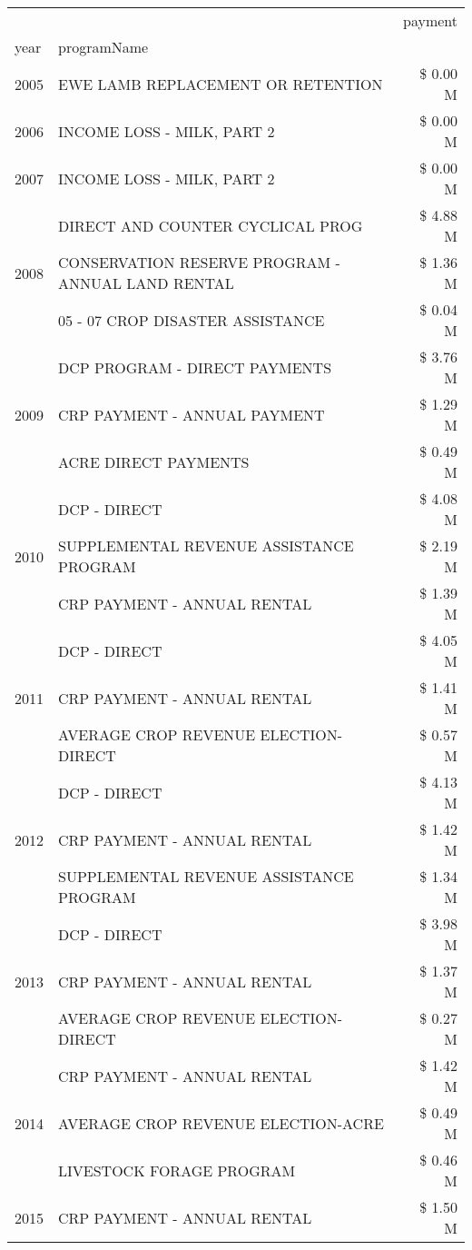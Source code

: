 \begin{tabular}{llr}
\toprule
 &  & payment \\
year & programName &  \\
\midrule
2005 & EWE LAMB REPLACEMENT OR RETENTION & \$ 0.00 M \\
\cline{1-3}
2006 & INCOME LOSS - MILK, PART 2 & \$ 0.00 M \\
\cline{1-3}
2007 & INCOME LOSS - MILK, PART 2 & \$ 0.00 M \\
\cline{1-3}
\multirow[t]{3}{*}{2008} & DIRECT AND COUNTER CYCLICAL PROG & \$ 4.88 M \\
 & CONSERVATION RESERVE PROGRAM - ANNUAL LAND RENTAL & \$ 1.36 M \\
 & 05 - 07 CROP DISASTER ASSISTANCE & \$ 0.04 M \\
\cline{1-3}
\multirow[t]{3}{*}{2009} & DCP PROGRAM - DIRECT PAYMENTS & \$ 3.76 M \\
 & CRP PAYMENT - ANNUAL PAYMENT & \$ 1.29 M \\
 & ACRE DIRECT PAYMENTS & \$ 0.49 M \\
\cline{1-3}
\multirow[t]{3}{*}{2010} & DCP - DIRECT & \$ 4.08 M \\
 & SUPPLEMENTAL REVENUE ASSISTANCE PROGRAM & \$ 2.19 M \\
 & CRP PAYMENT - ANNUAL RENTAL & \$ 1.39 M \\
\cline{1-3}
\multirow[t]{3}{*}{2011} & DCP - DIRECT & \$ 4.05 M \\
 & CRP PAYMENT - ANNUAL RENTAL & \$ 1.41 M \\
 & AVERAGE CROP REVENUE ELECTION-DIRECT & \$ 0.57 M \\
\cline{1-3}
\multirow[t]{3}{*}{2012} & DCP - DIRECT & \$ 4.13 M \\
 & CRP PAYMENT - ANNUAL RENTAL & \$ 1.42 M \\
 & SUPPLEMENTAL REVENUE ASSISTANCE PROGRAM & \$ 1.34 M \\
\cline{1-3}
\multirow[t]{3}{*}{2013} & DCP - DIRECT & \$ 3.98 M \\
 & CRP PAYMENT - ANNUAL RENTAL & \$ 1.37 M \\
 & AVERAGE CROP REVENUE ELECTION-DIRECT & \$ 0.27 M \\
\cline{1-3}
\multirow[t]{3}{*}{2014} & CRP PAYMENT - ANNUAL RENTAL & \$ 1.42 M \\
 & AVERAGE CROP REVENUE ELECTION-ACRE & \$ 0.49 M \\
 & LIVESTOCK FORAGE PROGRAM & \$ 0.46 M \\
\cline{1-3}
\multirow[t]{3}{*}{2015} & CRP PAYMENT - ANNUAL RENTAL & \$ 1.50 M \\

\end{tabular}
